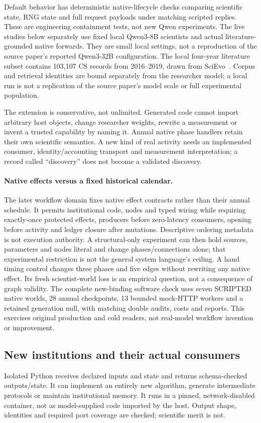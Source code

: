 Default behavior has deterministic native-lifecycle checks comparing scientific
state, RNG state and full request payloads under matching scripted replies.
These are engineering containment tests, not new Qwen experiments. The live
studies below separately use fixed local Qwen3-8B scientists and actual
literature-grounded native forwards. They are small local settings, not a
reproduction of the source paper's reported Qwen3-32B configuration.
The local four-year literature subset contains 103,107 CS records from 2016--2019,
drawn from SciEvo~\citep{jin2024scievo}. Corpus and retrieval identities are
bound separately from the researcher model; a local run is not a replication
of the source paper's model scale or full experimental population.

The extension is conservative, not unlimited. Generated code cannot import
arbitrary host objects, change researcher weights, rewrite a measurement or
invent a trusted capability by naming it. Annual native phase handlers retain
their own scientific semantics. A new kind of real activity needs an implemented
consumer, identity/accounting transport and measurement interpretation; a
record called ``discovery'' does not become a validated discovery.

\paragraph{Native effects versus a fixed historical calendar.}
The later workflow domain fixes native effect contracts rather than their
annual schedule. It permits institutional code, nodes and typed wiring while
requiring exactly-once protected effects, producers before zero-latency
consumers, opening before activity and ledger closure after mutations.
Descriptive ordering metadata is not execution authority. A structural-only
experiment can then hold sources, parameters and nodes literal and change
phases/connections alone; that experimental restriction is not the general
system language's ceiling. A hand timing control changes three phases and
five edges without rewriting any native effect. Its fresh scientist-world
loss is an empirical question, not a consequence of graph validity.
The complete new-binding software check uses seven SCRIPTED native worlds,
28 annual checkpoints, 13 bounded mock-HTTP workers and a retained generation
null, with matching double audits, costs and reports. This exercises original
production and cold readers, not real-model workflow invention or improvement.

\subsection{New institutions and their actual consumers}
Isolated Python receives declared inputs and state and returns schema-checked
outputs/state. It can implement an entirely new algorithm, generate intermediate
protocols or maintain institutional memory. It runs in a pinned, network-disabled
container, not as model-supplied code imported by the host. Output shape,
identities and required port coverage are checked; scientific merit is not.

